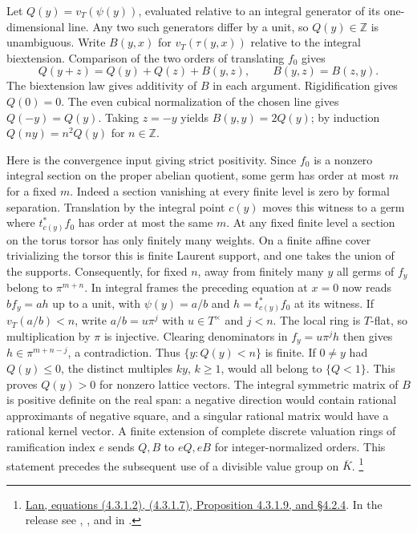 Let \(Q(y)=v_T(\psi(y))\), evaluated relative to an integral generator
of its one-dimensional line. Any two such generators differ by a
unit, so \(Q(y)\in\mathbb Z\) is unambiguous. Write \(B(y,x)\) for
\(v_T(\tau(y,x))\) relative to the integral biextension. Comparison of
the two orders of translating \(f_0\) gives
\[
  Q(y+z)=Q(y)+Q(z)+B(y,z),\qquad B(y,z)=B(z,y).
\]
The biextension law gives additivity of \(B\) in each argument.
Rigidification gives \(Q(0)=0\). The even cubical normalization of
the chosen line gives \(Q(-y)=Q(y)\). Taking \(z=-y\) yields
\(B(y,y)=2Q(y)\); by induction \(Q(ny)=n^2Q(y)\) for \(n\in\mathbb Z\).

Here is the convergence input giving strict positivity. Since \(f_0\)
is a nonzero integral section on the proper abelian quotient, some
germ has order at most \(m\) for a fixed \(m\). Indeed a section
vanishing at every finite level is zero by formal separation.
Translation by the integral point \(c(y)\) moves this witness to a
germ where \(t_{c(y)}^*f_0\) has order at most the same \(m\). At any
fixed finite level a section on the torus torsor has only finitely
many weights. On a finite affine cover trivializing the torsor this
is finite Laurent support, and one takes the union of the supports.
Consequently, for fixed \(n\), away from finitely many \(y\) all germs
of \(f_y\) belong to \(\pi^{m+n}\). In integral frames the preceding
equation at \(x=0\) now reads \(b f_y=a h\) up to a unit, with
\(\psi(y)=a/b\) and \(h=t_{c(y)}^*f_0\) at its witness.
If \(v_T(a/b)<n\), write \(a/b=u\pi^j\) with \(u\in T^\times\)
and \(j<n\). The local ring is \(T\)-flat, so multiplication by \(\pi\)
is injective. Clearing denominators in \(f_y=u\pi^j h\) then gives
\(h\in\pi^{m+n-j}\), a contradiction. Thus \(\{y:Q(y)<n\}\) is
finite. If \(0\ne y\) had \(Q(y)\le0\), the distinct multiples
\(ky\), \(k\ge1\), would all belong to \(\{Q<1\}\).
This proves \(Q(y)>0\) for nonzero lattice vectors. The integral
symmetric matrix of \(B\) is positive definite on the real span:
a negative direction would contain rational approximants of negative
square, and a singular rational matrix would have a rational kernel
vector. A finite extension of complete discrete valuation rings of
ramification index \(e\) sends \(Q,B\) to \(eQ,eB\) for
integer-normalized orders. This statement precedes the subsequent
use of a divisible value group on \(\overline K\).
\footnote{\href{https://www.kwlan.org/articles/cpt-PEL-type-thesis-revision-dense.pdf}{Lan,
equations (4.3.1.2), (4.3.1.7), Proposition 4.3.1.9, and
\S4.2.4}. In the release see
,
, 
and  in
.}

